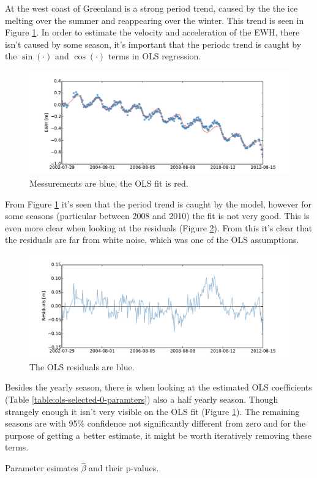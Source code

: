 At the west coast of Greenland is a strong period trend, caused by the the ice melting over the summer and reappearing over the winter. This trend is seen in Figure \ref{fig:ols-selected-0-fit}. In order to estimate the velocity and acceleration of the EWH, there isn't caused by some season, it's important that the periodc trend is caught by the $\sin(\cdot)$ and $\cos(\cdot)$ terms in OLS regression.
\begin{figure}[H]
	\centering
	\includegraphics[width=\textwidth]{figures/ols-selected-0-fit}
	\caption{Messurements are blue, the OLS fit is red.}
	\label{fig:ols-selected-0-fit}
\end{figure}
 
From Figure \ref{fig:ols-selected-0-fit} it's seen that the period trend is caught by the model, however for some seasons (particular between 2008 and 2010) the fit is not very good. This is even more clear when looking at the residuals (Figure \ref{fig:ols-selected-0-residual}). From this it's clear that the residuals are far from white noise, which was one of the OLS assumptions.
\begin{figure}[H]
	\centering
	\includegraphics[width=\textwidth]{figures/ols-selected-0-residual}
	\caption{The OLS residuals are blue.}
	\label{fig:ols-selected-0-residual}
\end{figure}

Besides the yearly season, there is when looking at the estimated OLS coefficients (Table \ref{table:ols-selected-0-paramters}) also a half yearly season. Though strangely enough it isn't very visible on the OLS fit (Figure \ref{fig:ols-selected-0-fit}). The remaining seasons are with 95\% confidence not significantly different from zero and for the purpose of getting a better estimate, it might be worth iteratively removing these terms.
\begin{table}[H]
\centering
\centerline{}
\caption{Parameter esimates $\hat{\beta}$ and their p-values. }
\label{table:ols-selected-0-paramters}
\end{table}

